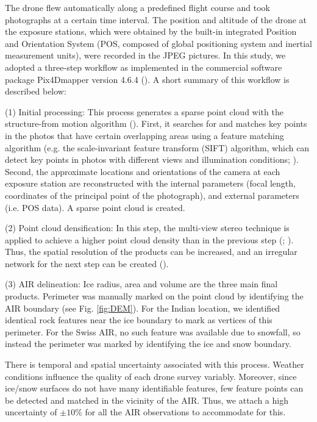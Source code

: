 \documentclass[utf8]{frontiersSCNS}
\begin{document}
The drone flew automatically along a predefined flight course and took photographs at a certain time interval. The
position and altitude of the drone at the exposure stations, which were obtained by the built-in integrated
Position and Orientation System (POS, composed of global positioning system and inertial measurement units),
were recorded in the JPEG pictures. In this study, we adopted a three-step workflow as implemented in the
commercial software package Pix4Dmapper version 4.6.4 (\cite{Pix4D}). A short summary of this workflow is
described below:

(1) Initial processing: This process generates a sparse point cloud with the structure-from motion algorithm
(\cite{Turner_2012}). First, it searches for and matches key points in the photos that have certain overlapping
areas using a feature matching algorithm (e.g. the scale-invariant feature transform (SIFT) algorithm, which can
detect key points in photos with different views and illumination conditions; \cite{Lowe_2004}). Second, the
approximate locations and orientations of the camera at each exposure station are reconstructed with the internal
parameters (focal length, coordinates of the principal point of the photograph), and external parameters (i.e. POS
data). A sparse point cloud is created.

(2) Point cloud densification: In this step, the multi-view stereo technique is applied to achieve a higher point
cloud density than in the previous step (\cite{Furukawa_2010}; \cite{Molg_2017}). Thus, the spatial resolution of
the products can be increased, and an irregular network for the next step can be created (\cite{Kung_2011}).

(3) AIR delineation: Ice radius, area and volume are the three main final products. Perimeter was manually marked
on the point cloud by identifying the AIR boundary (see Fig. \ref{fig:DEM}). For the Indian location, we identified identical rock features
near the ice boundary to mark as vertices of this perimeter. For the Swiss AIR, no such feature was available due
to snowfall, so instead the perimeter was marked by identifying the ice and snow boundary.

There is temporal and spatial uncertainty associated with this process. Weather conditions influence the quality
of each drone survey variably. Moreover, since ice/snow surfaces do not have many identifiable features, few
feature points can be detected and matched in the vicinity of the AIR. Thus, we attach a high uncertainty of
$\pm 10 \%$ for all the AIR observations to accommodate for this.
\end{document}
